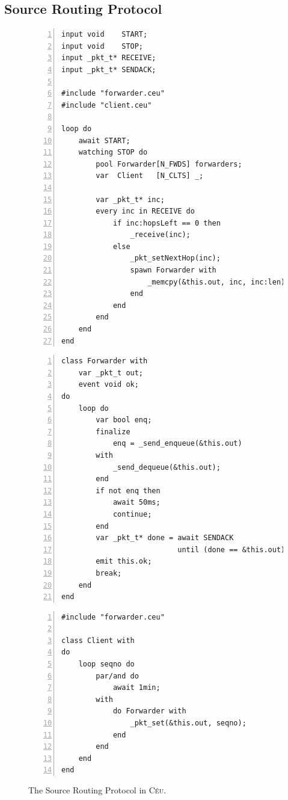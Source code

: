 \documentclass[preprint]{sigplanconf}
\newcommand{\CEU}{\textsc{C\'{e}u}\xspace}
\newcommand{\1}{\;}
\newcommand{\2}{\;\;}
\newcommand{\3}{\;\;\;}
\newcommand{\5}{\;\;\;\;\;}
\begin{document}
\subsection{Source Routing Protocol}
\label{sec.apps.srp}

\begin{figure}%
\begin{minipage}[t]{0.50\linewidth}
\begin{lstlisting}[numbers=left,xleftmargin=3em,title=File "main.ceu"]
input void    START;
input void    STOP;
input _pkt_t* RECEIVE;
input _pkt_t* SENDACK;

#include "forwarder.ceu"
#include "client.ceu"

loop do
    await START;
    watching STOP do
        pool Forwarder[N_FWDS] forwarders;
        var  Client   [N_CLTS] _;

        var _pkt_t* inc;
        every inc in RECEIVE do
            if inc:hopsLeft == 0 then
                _receive(inc);
            else
                _pkt_setNextHop(inc);
                spawn Forwarder with
                    _memcpy(&this.out, inc, inc:len);
                end
            end
        end
    end
end
\end{lstlisting}
\end{minipage}
%
\begin{minipage}[t]{0.49\linewidth}
\begin{lstlisting}[numbers=left,xleftmargin=3em,title=File "forwarder.ceu"]
class Forwarder with
    var _pkt_t out;
    event void ok;
do
    loop do
        var bool enq;
        finalize
            enq = _send_enqueue(&this.out)
        with
            _send_dequeue(&this.out);
        end
        if not enq then
            await 50ms;
            continue;
        end
        var _pkt_t* done = await SENDACK
                           until (done == &this.out);
        emit this.ok;
        break;
    end
end
\end{lstlisting}
\begin{lstlisting}[numbers=left,xleftmargin=3em,title=File "client.ceu"]
#include "forwarder.ceu"

class Client with
do
    loop seqno do
        par/and do
            await 1min;
        with
            do Forwarder with
                _pkt_set(&this.out, seqno);
            end
        end
    end
end
\end{lstlisting}
\end{minipage}
%
\caption{ The Source Routing Protocol in \CEU.
\label{lst.apps.srp}
}
\end{figure}
%
\end{document}
